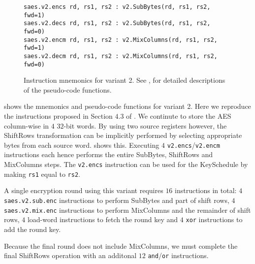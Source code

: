 
\begin{figure}
\begin{lstlisting}[language=pseudo,style=block]
saes.v2.encs rd, rs1, rs2 : v2.SubBytes(rd, rs1, rs2, fwd=1)
saes.v2.decs rd, rs1, rs2 : v2.SubBytes(rd, rs1, rs2, fwd=0)
saes.v2.encm rd, rs1, rs2 : v2.MixColumns(rd, rs1, rs2, fwd=1)
saes.v2.decm rd, rs1, rs2 : v2.MixColumns(rd, rs1, rs2, fwd=0)
\end{lstlisting}
\caption{
    Instruction mnemonics for variant 2.
    See ,  for detailed
    descriptions of the pseudo-code functions.
}
\label{fig:mnemonics:v2}
\end{figure}

 shows the mnemonics and pseudo-code functions
for variant 2.
Here we reproduce the instructions proposed in Section $4.3$ of
\cite{TilGro:06}.
We continute to store the AES column-wise in $4$ $32$-bit words.
By using two source registers however,
the ShiftRows transformation can be implicitly performed by selecting
appropriate bytes from each source word.
shows this.
Executing $4$  {\tt v2.encs}/{\tt v2.encm} instructions each hence
performs the entire SubBytes, ShiftRows and MixColumns steps.
The {\tt v2.encs} instruction can be used for the KeySchedule by
making {\tt rs1} equal to {\tt rs2}.

A single encryption round using this variant requires $16$ instructions
in total:
$4$ {\tt saes.v2.sub.enc} instructions to perform SubBytes and part of
shift rows,
$4$ {\tt saes.v2.mix.enc} instructions to perform MixColumns and the
remainder of shift rows,
$4$ load-word instructions to fetch the round key
and
$4$ {\tt xor} instructions to add the round key.

Because the final round does not include MixColumns, we must
complete the final ShiftRows operation with an additonal
$12$ {\tt and}/{\tt or} instructions.

